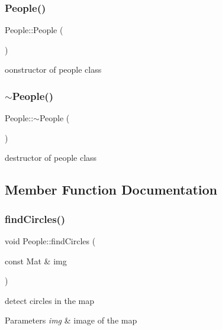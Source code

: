 \subsubsection{\texorpdfstring{People()}{People()}}
{\footnotesize\ttfamily People\+::\+People (\begin{DoxyParamCaption}{ }\end{DoxyParamCaption})}

oonstructor of people class \mbox{\label{class_people_adae124857f64dadff4e1801410b3dab2}} 
\subsubsection{\texorpdfstring{$\sim$\+People()}{~People()}}
{\footnotesize\ttfamily People\+::$\sim$\+People (\begin{DoxyParamCaption}{ }\end{DoxyParamCaption})}

destructor of people class 

\subsection{Member Function Documentation}
\mbox{\label{class_people_a4c13aebe88654dba21a2a12b8b5943f7}} 
\subsubsection{\texorpdfstring{find\+Circles()}{findCircles()}}
{\footnotesize\ttfamily void People\+::find\+Circles (\begin{DoxyParamCaption}\item[{const Mat \&}]{img }\end{DoxyParamCaption})}

detect circles in the map 
\begin{DoxyParams}{Parameters}
{\em img} & image of the map \\
\hline
\end{DoxyParams}
\mbox{\label{class_people_a0fc4e671ff110314dc0dc65ee150f04c}} 
